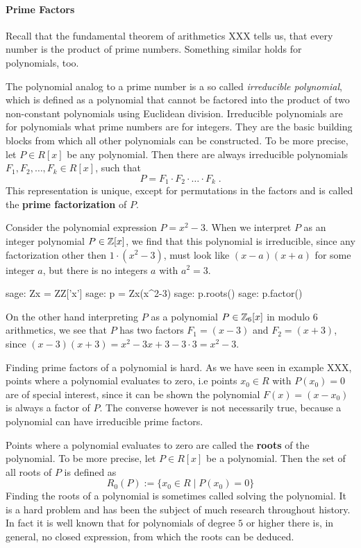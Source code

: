 \paragraph{Prime Factors} Recall that the fundamental theorem of arithmetics XXX tells us, that every number is the product of prime numbers. Something similar holds for polynomials, too. 

The polynomial analog to a prime number is a so called \textit{irreducible polynomial}, which is defined as a polynomial that cannot be factored into the product of two non-constant polynomials using Euclidean division. Irreducible polynomials are for polynomials what prime numbers are for integers. They are the basic building blocks from which all other polynomials can be constructed. To be more precise, let $P \in R[x]$ be any polynomial. Then there are always irreducible polynomials $F_1, F_2, \ldots, F_k \in R[x]$, such that
\begin{equation}
P = F_1 \cdot F_2 \cdot \ldots \cdot F_k \;.
\end{equation}
This representation is unique, except for permutations in the factors and is called the \textbf{prime factorization} of $P$.
\begin{example} Consider the polynomial expression $P=x^2-3$. When we interpret $P$ as an integer polynomial $P\in\mathbb{Z}[x]$, we find that this polynomial is irreducible, since any factorization other then $1\cdot(x^2-3)$, must look like $(x-a)(x+a)$ for some integer $a$, but there is no integers $a$ with $a^2=3$. 
\begin{sagecommandline}
sage: Zx = ZZ['x']
sage: p = Zx(x^2-3)
sage: p.roots()
sage: p.factor()
\end{sagecommandline}
On the other hand interpreting $P$ as a polynomial $P\in \mathbb{Z}_6[x]$ in modulo $6$ arithmetics, we see that $P$ has two factors $F_1=(x-3)$ and $F_2=(x+3)$, since 
$(x-3)(x+3)= x^2 -3x +3 -3\cdot 3= x^2-3$. 
\end{example}
Finding prime factors of a polynomial is hard. As we have seen in example XXX, points where a polynomial evaluates to zero, i.e points $x_0\in R$ with $P(x_0)=0$ are of special interest, since it can be shown the polynomial $F(x)=(x-x_0)$ is always a factor of $P$. The converse however is not necessarily true, because a polynomial can have irreducible prime factors. 

Points where a polynomial evaluates to zero are called the \textbf{roots} of the polynomial. To be more precise, let $P\in R[x]$ be a polynomial. Then the set of all roots of $P$ is defined as
\begin{equation}
R_0(P):=\{x_0\in R\;|\; P(x_0)=0\}
\end{equation}
Finding the roots of a polynomial is sometimes called solving the polynomial. It is a hard problem and has been the subject of much research throughout history. In fact it is well known that for polynomials of degree $5$ or higher there is, in general, no closed expression, from which the roots can be deduced. 

